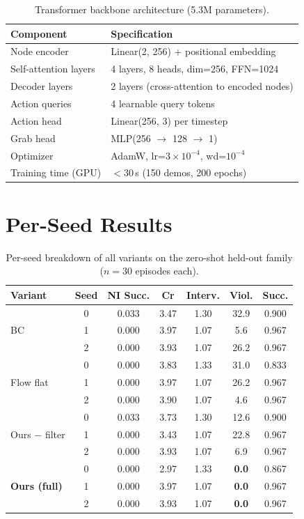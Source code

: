 \documentclass[11pt,a4paper]{article}
\begin{document}
\begin{table}[h]
\centering
\caption{Transformer backbone architecture (5.3M parameters).}
\label{tab:transformer}
\begin{tabular}{@{}ll@{}}
\toprule
Component & Specification \\
\midrule
Node encoder & Linear(2, 256) + positional embedding \\
Self-attention layers & 4 layers, 8 heads, dim=256, FFN=1024 \\
Decoder layers & 2 layers (cross-attention to encoded nodes) \\
Action queries & 4 learnable query tokens \\
Action head & Linear(256, 3) per timestep \\
Grab head & MLP(256 $\to$ 128 $\to$ 1) \\
Optimizer & AdamW, lr=$3\times10^{-4}$, wd=$10^{-4}$ \\
Training time (GPU) & $<$30\,s (150 demos, 200 epochs) \\
\bottomrule
\end{tabular}
\end{table}

\section{Per-Seed Results}
\label{app:seeds}

\begin{table}[h]
\centering
\caption{Per-seed breakdown of all variants on the zero-shot held-out family
($n=30$ episodes each).}
\label{tab:seeds}
\begin{tabular}{@{}lcccccc@{}}
\toprule
Variant & Seed & NI Succ. & Cr & Interv. & Viol. & Succ. \\
\midrule
\multirow{3}{*}{BC} & 0 & 0.033 & 3.47 & 1.30 & 32.9 & 0.900 \\
& 1 & 0.000 & 3.97 & 1.07 & 5.6 & 0.967 \\
& 2 & 0.000 & 3.93 & 1.07 & 26.2 & 0.967 \\
\midrule
\multirow{3}{*}{Flow flat} & 0 & 0.000 & 3.83 & 1.33 & 31.0 & 0.833 \\
& 1 & 0.000 & 3.97 & 1.07 & 26.2 & 0.967 \\
& 2 & 0.000 & 3.90 & 1.07 & 4.6 & 0.967 \\
\midrule
\multirow{3}{*}{Ours $-$ filter} & 0 & 0.033 & 3.73 & 1.30 & 12.6 & 0.900 \\
& 1 & 0.000 & 3.43 & 1.07 & 22.8 & 0.967 \\
& 2 & 0.000 & 3.93 & 1.07 & 6.9 & 0.967 \\
\midrule
\multirow{3}{*}{\textbf{Ours (full)}} & 0 & 0.000 & 2.97 & 1.33 & \textbf{0.0} & 0.867 \\
& 1 & 0.000 & 3.97 & 1.07 & \textbf{0.0} & 0.967 \\
& 2 & 0.000 & 3.93 & 1.07 & \textbf{0.0} & 0.967 \\
\bottomrule
\end{tabular}
\end{table}
\end{document}
